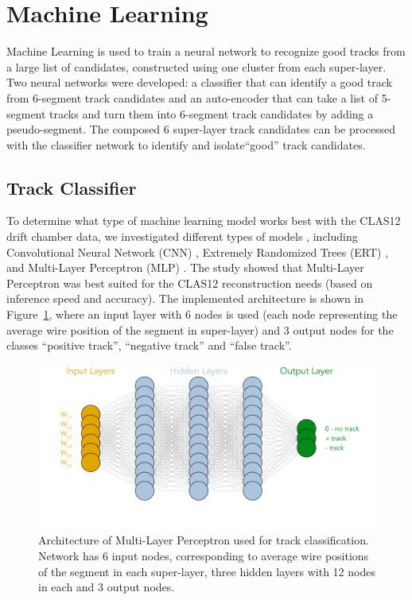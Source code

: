 \documentclass[aps,prl,preprint,12pt]{elsarticle}
\begin{document}
\section{Machine Learning}

Machine Learning is used to train a neural network to recognize good tracks
 from a large list of candidates, constructed using one cluster from each super-layer.
 Two neural networks were developed: a classifier that can identify a good track from  
 6-segment track candidates and an auto-encoder that can take a list of 5-segment tracks 
 and turn them into 6-segment track candidates by adding a pseudo-segment. The composed 
 6 super-layer track candidates can be processed with the classifier network to identify and 
 isolate``good'' track candidates.


 
 \subsection{Track Classifier}
 
 To determine what type of machine learning model works best with the CLAS12 drift chamber data, 
 we investigated different types of models  \cite{Gavalian:2020oxg}, including Convolutional Neural 
 Network (CNN) , Extremely Randomized Trees (ERT) \cite{scikitlearn-extratreesclassifier}, and 
 Multi-Layer Perceptron (MLP) \cite{scikitlearn-mlpclassifier}. The study showed that Multi-Layer 
 Perceptron was best suited for the CLAS12 reconstruction needs (based on inference speed and accuracy). 
 The implemented architecture is shown in Figure~\ref{mlp:architecture}, where an input layer with 6 
 nodes is used (each node representing the average wire position of the segment in super-layer) and 3 
 output nodes for the classes ``positive track'', ``negative track'' and ``false track''.
 
 \begin{figure}[!ht]
\begin{center}
  \includegraphics[width=4.5in]{images/mlp_diagram.pdf}
\caption {Architecture of Multi-Layer Perceptron used for track classification. Network has 6 input nodes,
corresponding to average wire positions of the segment in each super-layer, three hidden layers with 12 nodes 
in each and 3 output nodes.}
 \label{mlp:architecture}
 \end{center}
\end{figure}
\end{document}
